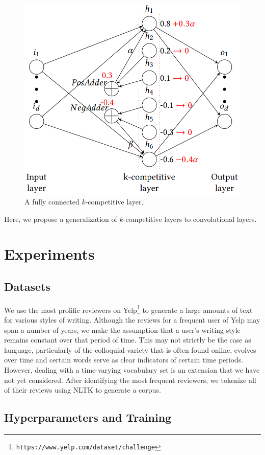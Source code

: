 \documentclass{vldb}
\begin{document}
\begin{figure}[h]
\centering
\includegraphics[width=.8\linewidth]{k_complayer.png}
\caption{\textmd{A fully connected $k$-competitive layer.}}
\end{figure}

Here, we propose a generalization of $k$-competitive layers to convolutional layers.

\section{Experiments}
\subsection{Datasets}
We use the most prolific reviewers on Yelp\footnote{{\texttt{https://www.yelp.com/dataset/challenge}}} to generate a large amounts of text for various styles of writing. Although the reviews for a frequent user of Yelp may span a number of years, we make the assumption that a user's writing style remains constant over that period of time. This may not strictly be the case as language, particularly of the colloquial variety that is often found online, evolves over time and certain words serve as clear indicators of certain time periods. However, dealing with a time-varying vocabulary set is an extension that we have not yet considered. After identifying the most frequent reviewers, we tokenize all of their reviews using NLTK \cite{Loper02nltk:the} to generate a corpus. 

\subsection{Hyperparameters and Training}
\end{document}
